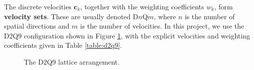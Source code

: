 \documentclass[a4paper, 11pt]{report}
\begin{document}
The discrete velocities $\textbf{c}_k$, together with the weighting coefficients $w_k$, form \textbf{velocity sets}. These are usually denoted D$n$Q$m$, where $n$ is the number of spatial directions and $m$ is the number of velocities. In this project, we use the D2Q9 configuration shown in Figure \ref{fig:d2q9}, with the explicit velocities and weighting coefficients given in Table \ref{table:d2q9}.


\begin{figure}[!hbt]
\centering

\caption{The D2Q9 lattice arrangement.} \label{fig:d2q9}
\end{figure}
\end{document}
